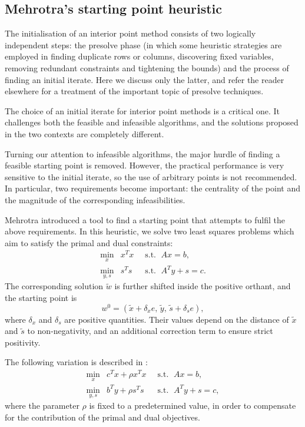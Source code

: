 %
%
\subsection{Mehrotra's starting point heuristic}
\label{sec:StartingPoint}

The initialisation of an interior point method consists of two
logically independent steps: the presolve phase (in which some
heuristic strategies are employed in finding duplicate rows or
columns, discovering fixed variables, removing redundant constraints 
and tightening the bounds)
and the process of finding an initial iterate.
Here we discuss only the latter, and refer the reader 
elsewhere
for a treatment of the important topic of presolve techniques.

The choice of an initial iterate for interior point methods is a
critical one. It challenges both the feasible and infeasible
algorithms, and the solutions proposed in the two contexts are
completely different.

Turning our attention to infeasible algorithms, the major hurdle
of finding a feasible starting point is removed. 
However, the practical performance is very sensitive to the initial
iterate, so the use of arbitrary points is not recommended.
In particular, two requirements become important: the centrality 
of the point and the magnitude of the corresponding infeasibilities.

Mehrotra \cite{Mehrotra92} introduced a tool to find a starting point 
that attempts to fulfil the above requirements. In this
heuristic, we solve two least squares problems which aim to
satisfy the primal and dual constraints:
\begin{eqnarray*}
  \min_x    \!\! & x^Tx & \;\;\mbox{s.t. }\; Ax = b,      \\
  \min_{y,s}\!\! & s^Ts & \;\;\mbox{s.t. }\; A^Ty + s = c.
\end{eqnarray*}
The corresponding solution $\tilde w$ is further 
shifted inside the positive orthant, and the starting point is
\[
  w^0 = (\tilde x + \delta_x e,\, \tilde y,\, \tilde s + \delta_s e),
\]
where $\delta_x$ and $\delta_s$ are positive quantities. 
Their values depend on the distance of $\tilde x$ and $\tilde s$
to non-negativity, and an additional correction term to ensure
strict positivity.

The following variation is described in \cite{GondzioTerlaky}:
\begin{eqnarray*} 
  \min_x    \!\! & c^Tx + \rho x^Tx & \;\;\mbox{s.t. }\; Ax = b,      \\
  \min_{y,s}\!\! & b^Ty + \rho s^Ts & \;\;\mbox{s.t. }\; A^Ty + s = c,
\end{eqnarray*}
where the parameter $\rho$ is fixed to a predetermined value, in order
to compensate for the contribution of the primal and dual objectives.

